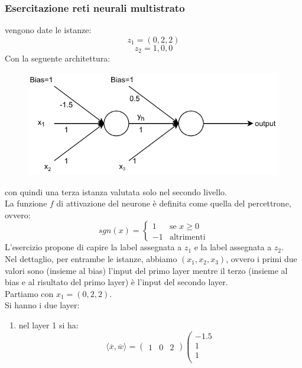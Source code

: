 \documentclass[a4paper,12pt, oneside]{book}
\begin{document}
\subsubsection{Esercitazione reti neurali multistrato}
\begin{esercizio}
  vengono date le istanze:
  \[z_1=(0,2,2)\]
  \[z_2=1,0,0\]
  Con la seguente architettura:
  \begin{figure}[H]
    \centering
    \includegraphics[scale = 0.9]{img/per2.pdf}
  \end{figure}
  con quindi una terza istanza valutata solo nel secondo livello.\\
  La funzione $f$ di attivazione del neurone è definita come quella del
  percettrone, ovvero:
  \[sgn(x)=
    \begin{cases}
      1&\mbox{se } x\geq 0\\
      -1&\mbox{altrimenti}
    \end{cases}
  \]
  L'esercizio propone di capire la label assegnata a $z_1$ e la label assegnata
  a $z_2$.\\
  Nel dettaglio, per entrambe le istanze, abbiamo $(x_1,x_2,x_3)$, ovvero i
  primi due valori sono (insieme al bias) l'input del primo layer mentre il
  terzo (insieme al bias e al risultato del primo layer) è l'input del secondo
  layer.\\
  Partiamo con $x_1=(0,2,2)$.\\
  Si hanno i due layer:
  \begin{enumerate}
    \item nel layer 1 si ha:
    \[\langle \overline{x},\overline{w}\rangle=
      \left(\begin{matrix}
          1 & 0 & 2
        \end{matrix}\right)
      \left(
        \begin{matrix}
          -1.5 \\
          1 \\
          1 \\

\end{matrix}\]
\end{enumerate}
\end{esercizio}
\end{document}
